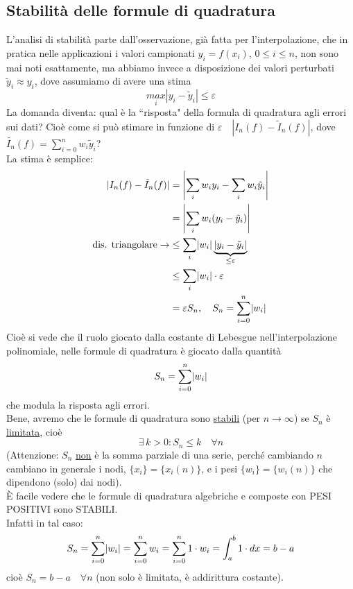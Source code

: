 \documentclass[12pt,a4paper]{article}
\DeclarePairedDelimiter{\abs}{\lvert}{\rvert}
\begin{document}
\subsection{Stabilità delle formule di quadratura}
L'analisi di stabilità parte dall'osservazione, già fatta per l'interpolazione, che in pratica
nelle applicazioni i valori campionati $y_i=f(x_i)$, $0\leq i\leq n$, non sono mai noti esattamente, ma abbiamo invece a disposizione dei valori perturbati $\tilde{y}_i\approx y_i$, dove assumiamo di avere una stima 
\begin{equation*}
    \underset{i}{max}|y_i-\tilde{y}_i|\leq \varepsilon
\end{equation*}
La domanda diventa: qual è la ``risposta" della formula di quadratura agli errori sui dati? Cioè come si può stimare in funzione di $\varepsilon \quad |I_n(f)-\tilde{I}_n(f)|$, dove $\tilde{I_n}(f)=\sum_{i=0}^nw_i\tilde{y}_i$?\\
La stima è semplice:
\[\begin{split}
    \abs{I_n(f) - \Tilde{I}_n(f)} & = \abs*{\sum_i w_i y_i - \sum_i w_i \Tilde{y}_i} \\
    & = \abs*{\sum_i w_i( y_i - \Tilde{y}_i)} \\
    \text{dis. triangolare} \to & \le \sum_i \abs*{w_i} \underbrace{\abs*{y_i - \Tilde{y}_i}}_{\le \varepsilon} \\
    & \le \sum_i \abs*{w_i} \cdot \varepsilon \\
    & = \varepsilon S_n, \quad S_n = \sum_{i=0}^n \abs*{w_i}
\end{split}\]
Cioè si vede che il ruolo giocato dalla costante di Lebesgue nell'interpolazione polinomiale, nelle formule di quadratura è giocato dalla quantità
\[S_n = \sum_{i=0}^n \abs*{w_i}\]
che modula la risposta agli errori.\\
Bene, avremo che le formule di quadratura sono \uline{stabili} (per $n \to \infty$) se $S_n$ è \uline{limitata}, cioè
\[\exists\, k > 0 : S_n \le k \quad \forall n\]
(Attenzione: $S_n$ \uline{non} è la somma parziale di una serie, perché cambiando $n$ cambiano in generale i nodi, $\{x_i\} = \{x_i(n)\}$, e i pesi $\{w_i\} = \{w_i(n)\}$ che dipendono (solo) dai nodi). \\
È facile vedere che le formule di quadratura algebriche e composte con PESI POSITIVI sono STABILI.\\
Infatti in tal caso:
\[S_n = \sum_{i=0}^n \abs*{w_i} = \sum_{i=0}^n w_i = \sum_{i=0}^n 1 \cdot w_i = \int_a^b 1 \cdot dx = b - a\]
cioè $S_n = b-a \quad \forall n$ (non solo è limitata, è addirittura costante).\\
\end{document}
